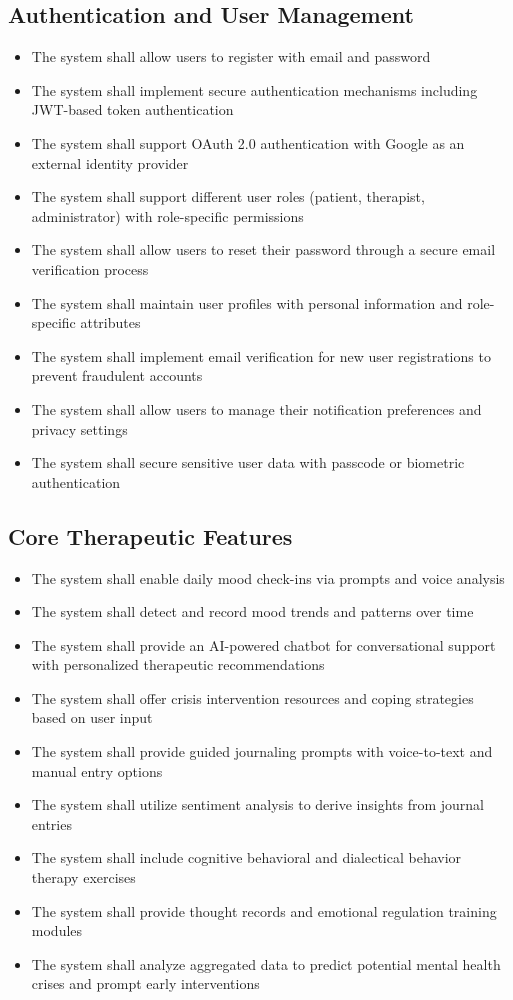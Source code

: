 \subsection{Authentication and User Management}
\begin{itemize}
    \item The system shall allow users to register with email and password
    \item The system shall implement secure authentication mechanisms including JWT-based token authentication
    \item The system shall support OAuth 2.0 authentication with Google as an external identity provider
    \item The system shall support different user roles (patient, therapist, administrator) with role-specific permissions
    \item The system shall allow users to reset their password through a secure email verification process
    \item The system shall maintain user profiles with personal information and role-specific attributes
    \item The system shall implement email verification for new user registrations to prevent fraudulent accounts
    \item The system shall allow users to manage their notification preferences and privacy settings
    \item The system shall secure sensitive user data with passcode or biometric authentication
\end{itemize}

\subsection{Core Therapeutic Features}
\begin{itemize}
    \item The system shall enable daily mood check-ins via prompts and voice analysis
    \item The system shall detect and record mood trends and patterns over time
    \item The system shall provide an AI-powered chatbot for conversational support with personalized therapeutic recommendations
    \item The system shall offer crisis intervention resources and coping strategies based on user input
    \item The system shall provide guided journaling prompts with voice-to-text and manual entry options
    \item The system shall utilize sentiment analysis to derive insights from journal entries
    \item The system shall include cognitive behavioral and dialectical behavior therapy exercises
    \item The system shall provide thought records and emotional regulation training modules
    \item The system shall analyze aggregated data to predict potential mental health crises and prompt early interventions
\end{itemize}

